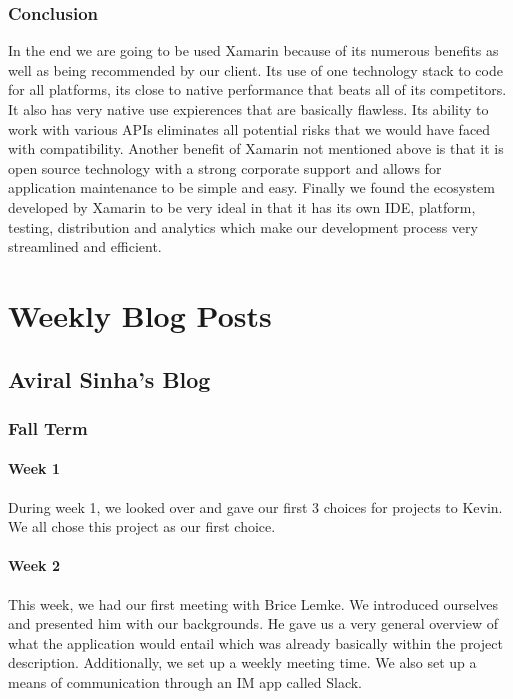 \documentclass[onecolumn, draftclsnofoot,10pt, compsoc]{IEEEtran}
\begin{document}
\subsubsection{Conclusion}
In the end we are going to be used Xamarin because of its numerous benefits as well as being recommended by our client. Its use of one technology stack to code for all platforms, its close to native performance that beats all of its competitors. It also has very native use expierences that are basically flawless. Its ability to work with various APIs eliminates all potential risks that we would have faced with compatibility. Another benefit of Xamarin not mentioned above is that it is open source technology with a strong corporate support and allows for application maintenance to be simple and easy. Finally we found the ecosystem developed by Xamarin to be very ideal in that it has its own IDE, platform, testing, distribution and analytics which make our development process very streamlined and efficient. 






\newpage




\section{Weekly Blog Posts} 
\subsection{Aviral Sinha's Blog}
\subsubsection{Fall Term} 
 \paragraph{Week 1}
    During week 1, we looked over and gave our first 3 choices for projects to Kevin. We all chose this project as our first choice. 
    
    \paragraph{Week 2}
    This week, we had our first meeting with Brice Lemke. We introduced ourselves and presented him with our backgrounds. He gave us a very general overview of what the application would entail which was already basically within the project description. Additionally, we set up a weekly meeting time. We also set up a means of communication through an IM app called Slack.
    
\end{document}
